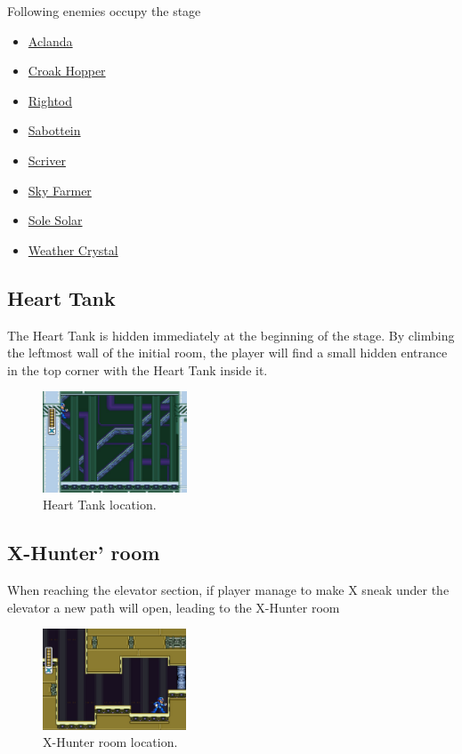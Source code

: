 Following enemies occupy the stage~\cite{wiki:weather_control}
\begin{itemize}
	\item \hyperlink{enem:Aclanda}{Aclanda}
	\item \hyperlink{enem:Croak_hopper}{Croak Hopper}
	\item \hyperlink{enem:Rightod}{Rightod}
	\item \hyperlink{enem:Sabottein}{Sabottein}
	\item \hyperlink{enem:Scriver}{Scriver}
	\item \hyperlink{enem:Sky_farmer}{Sky Farmer}
	\item \hyperlink{enem:Sole_solar}{Sole Solar}
	\item \hyperlink{enem:Weather_crystal}{Weather Crystal}
\end{itemize}


\subsection{Heart Tank}
The Heart Tank is hidden immediately at the beginning of the stage. By climbing the leftmost wall of the initial room, the player will find a small hidden entrance in the top corner with the Heart Tank inside it.

\begin{figure}[htp]
	\centering
		\includegraphics[height=3cm]{figures/X2/Wire_sponge/Sponge_heart.jpg}
		\caption{Heart Tank location.}
\end{figure}

\subsection{X-Hunter' room}
When reaching the elevator section, if player manage to make X sneak under the elevator a new path will open, leading to the X-Hunter room
	\begin{figure}[htp]
	\centering
	\includegraphics[height=3cm]{figures/X2/Wire_sponge/Sponge_Hunter_room.jpg}
	\caption{X-Hunter room location.}
\end{figure}

